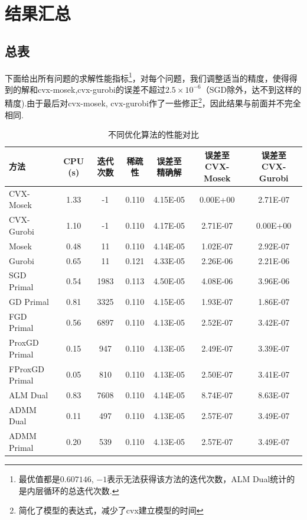 \documentclass[10pt,a4paper]{article}
\begin{document}
 \section{结果汇总}
 \subsection{总表}
 下面给出所有问题的求解性能指标\footnote{最优值都是$0.607146$, $-1$表示无法获得该方法的迭代次数，ALM Dual统计的是内层循环的总迭代次数.}，对每个问题，我们调整适当的精度，使得得到的解和cvx-mosek,cvx-gurobi的误差不超过$2.5\times10^{-6}$（SGD除外，达不到这样的精度).由于最后对cvx-mosek, cvx-gurobi作了一些修正\footnote{简化了模型的表达式，减少了cvx建立模型的时间}，因此结果与前面并不完全相同.
 \begin{table}[htbp]
 	\centering
 	\label{tab:optimization_comparison}
 	\begin{tabular}{lS[table-format=1.2]S[table-format=4.0]S[table-format=1.3]S[table-format=1.2e-1]S[table-format=1.2e-1]S[table-format=1.2e-1]}
 		\toprule
 		方法 & {CPU (s)} & {迭代次数}  & {稀疏性} & {误差至精确解} & {误差至CVX-Mosek} & {误差至CVX-Gurobi} \\
 		\midrule
 		CVX-Mosek & 1.33 & -1 & 0.110 & 4.15E-05 & 0.00E+00 & 2.71E-07 \\
 		CVX-Gurobi & 1.10 & -1 & 0.110 & 4.17E-05 & 2.71E-07 & 0.00E+00 \\
 		Mosek      & 0.48 & 11  & 0.110 & 4.14E-05 & 1.02E-07 & 2.92E-07 \\
 		Gurobi     & 0.65 & 11  & 0.121 & 4.33E-05 & 2.26E-06 & 2.21E-06 \\
 		SGD Primal & 0.54 & 1983 & 0.113 & 4.50E-05 & 4.08E-06 & 3.96E-06 \\
 		GD Primal  & 0.81 & 3325  & 0.110 & 4.15E-05 & 1.93E-07 & 1.86E-07 \\
 		FGD Primal & 0.56 & 6897  & 0.110 & 4.13E-05 & 2.52E-07 & 3.42E-07 \\
 		ProxGD Primal & 0.15 & 947  & 0.110 & 4.13E-05 & 2.49E-07 & 3.39E-07 \\
 		FProxGD Primal & 0.05 & 810  & 0.110 & 4.13E-05 & 2.50E-07 & 3.41E-07 \\
 		ALM Dual    & 0.83 & 7608  & 0.110 & 4.14E-05 & 8.74E-07 & 8.63E-07 \\
 		ADMM Dual   & 0.11 & 497 & 0.110 & 4.13E-05 & 2.57E-07 & 3.49E-07 \\
 		ADMM Primal & 0.20 & 539 & 0.110 & 4.13E-05 & 2.57E-07 & 3.49E-07 \\
 		\bottomrule
 	\end{tabular}
 	\caption{不同优化算法的性能对比}
 \end{table}
\end{document}
